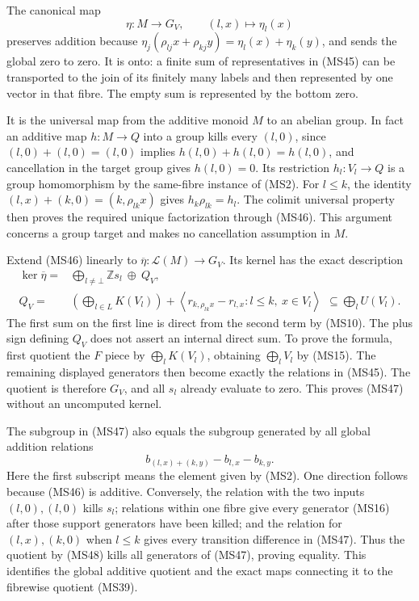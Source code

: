 \documentclass[
]{article}
\begin{document}
The canonical map \[
\eta:M\longrightarrow G_V,\qquad (l,x)\longmapsto\eta_l(x)
\tag{MS46}
\] preserves addition because
\(\eta_j(\rho_{lj}x+\rho_{kj}y)=\eta_l(x)+\eta_k(y)\), and sends the
global zero to zero. It is onto: a finite sum of representatives in
(MS45) can be transported to the join of its finitely many labels and
then represented by one vector in that fibre. The empty sum is
represented by the bottom zero.

It is the universal map from the additive monoid \(M\) to an abelian
group. In fact an additive map \(h:M\to Q\) into a group kills every
\((l,0)\), since \((l,0)+(l,0)=(l,0)\) implies \(h(l,0)+h(l,0)=h(l,0)\),
and cancellation in the target group gives \(h(l,0)=0\). Its restriction
\(h_l:V_l\to Q\) is a group homomorphism by the same-fibre instance of
(MS2). For \(l\le k\), the identity \((l,x)+(k,0)=(k,\rho_{lk}x)\) gives
\(h_k\rho_{lk}=h_l\). The colimit universal property then proves the
required unique factorization through (MS46). This argument concerns a
group target and makes no cancellation assumption in \(M\).

Extend (MS46) linearly to \(\overline\eta:\mathscr L(M)\to G_V\). Its
kernel has the exact description \[
\begin{split}
\ker\overline\eta
={}&\bigoplus_{l\ne\bot}\mathbb Zs_l\ \oplus\ Q_V,\\
Q_V
={}&\left(\bigoplus_{l\in L}K(V_l)\right)
+\left\langle r_{k,\rho_{lk}x}-r_{l,x}:
l\le k,\ x\in V_l\right\rangle
\ \,\subseteq\bigoplus_l U(V_l).
\end{split}
\tag{MS47}
\] The first sum on the first line is direct from the second term by
(MS10). The plus sign defining \(Q_V\) does not assert an internal
direct sum. To prove the formula, first quotient the \(F\) piece by
\(\bigoplus_lK(V_l)\), obtaining \(\bigoplus_lV_l\) by (MS15). The
remaining displayed generators then become exactly the relations in
(MS45). The quotient is therefore \(G_V\), and all \(s_l\) already
evaluate to zero. This proves (MS47) without an uncomputed kernel.

The subgroup in (MS47) also equals the subgroup generated by all global
addition relations \[
b_{(l,x)+(k,y)}-b_{l,x}-b_{k,y}.
\tag{MS48}
\] Here the first subscript means the element given by (MS2). One
direction follows because (MS46) is additive. Conversely, the relation
with the two inputs \((l,0),(l,0)\) kills \(s_l\); relations within one
fibre give every generator (MS16) after those support generators have
been killed; and the relation for \((l,x),(k,0)\) when \(l\le k\) gives
every transition difference in (MS47). Thus the quotient by (MS48) kills
all generators of (MS47), proving equality. This identifies the global
additive quotient and the exact maps connecting it to the fibrewise
quotient (MS39).
\end{document}
